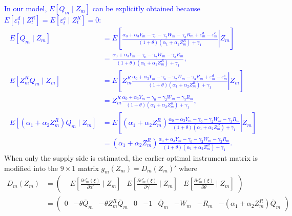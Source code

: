 \documentclass[11pt, a4paper]{article}
\begin{document}
\textcolor{blue}{
In our model, $E[Q_{m}\mid Z_{m}]$ can be explicitly obtained because $E[\varepsilon_{t}^{d}\mid Z_{t}^{R}] = E[\varepsilon_{t}^{c}\mid Z_{t}^{R}] = 0 $:
\begin{align*}
    E[Q_{m}\mid Z_{m}] &=E\left[\left.\frac{\alpha_0 + \alpha_3 Y_m - \gamma_0 - \gamma_2 W_{m} - \gamma_3 R_{m} + \varepsilon^{d}_{m} - \varepsilon^{c}_{m}}{(1 + \theta) (\alpha_1 + \alpha_2 Z^{R}_{m}) + \gamma_1}\right| Z_{m}\right] \\
    & = \frac{\alpha_0 + \alpha_3 Y_m - \gamma_0 - \gamma_2 W_{m} - \gamma_3 R_{m}}{(1 + \theta) (\alpha_1 + \alpha_2 Z^{R}_{m}) + \gamma_1},\\
    E[Z^{R}_{m}Q_{m}\mid Z_{m}] &=E\left[\left. Z^{R}_{m}\frac{\alpha_0 + \alpha_3 Y_m - \gamma_0 - \gamma_2 W_{m} - \gamma_3 R_{m} + \varepsilon^{d}_{m} - \varepsilon^{c}_{m}}{(1 + \theta) (\alpha_1 + \alpha_2 Z^{R}_{m}) + \gamma_1}\right | Z_{m}\right]\\
    & = Z^{R}_{m}\frac{\alpha_0 + \alpha_3 Y_m - \gamma_0 - \gamma_2 W_{m} - \gamma_3 R_{m}}{(1 + \theta) (\alpha_1 + \alpha_2 Z^{R}_{m}) + \gamma_1},\\
    E[(\alpha_1 + \alpha_2 Z^{R}_m)Q_{m}\mid Z_{m}] &=E\left[\left. (\alpha_1 + \alpha_2 Z^{R}_m)\frac{\alpha_0 + \alpha_3 Y_m - \gamma_0 - \gamma_2 W_{m} - \gamma_3 R_{m}}{(1 + \theta) (\alpha_1 + \alpha_2 Z^{R}_{m}) + \gamma_1}\right | Z_{m}\right]\\
    &= (\alpha_1 + \alpha_2 Z^{R}_m)\frac{\alpha_0 + \alpha_3 Y_m - \gamma_0 - \gamma_2 W_{m} - \gamma_3 R_{m}}{(1 + \theta) (\alpha_1 + \alpha_2 Z^{R}_{m}) + \gamma_1}.
\end{align*}
}
When only the supply side is estimated, the earlier optimal instrument matrix is modified into the $9\times 1$ matrix $g_{m}(Z_{m})=D_{m}(Z_{m})'$ where 
\begin{align*}
    D_{m}(Z_{m}) &= \begin{pmatrix}
    & E\left[\frac{\partial \varepsilon_{m}^{c}(\xi)}{\partial \alpha^{\prime}} \mid Z_{m}\right] & 
    E\left[\frac{\partial \varepsilon_{m}^{c}(\xi)}{\partial \gamma^{\prime}} \mid Z_{m}\right] & 
    E\left[\frac{\partial \varepsilon_{m}^{c}(\xi)}{\partial \theta} \mid Z_{m}\right]
    \end{pmatrix} \\
    &=\begin{pmatrix}
    0 &- \theta \overline{Q}_{m} & -\theta Z^{R}_{m}\overline{Q}_{m} & 0 & 
    -1 &
    \overline{Q}_{m} &
    -W_{m} &
    -R_{m} &
    -(\alpha_1 + \alpha_2 Z^{R}_m)\overline{Q}_{m}
    \end{pmatrix}
\end{align*}
\end{document}
